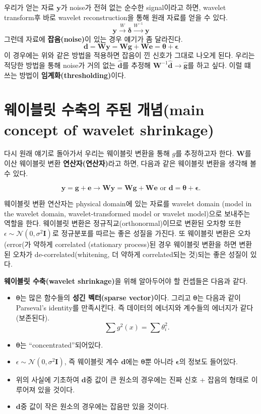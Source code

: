\documentclass[b5paper,]{book}
\theoremstyle{definition}
\theoremstyle{definition}
\theoremstyle{definition}
\theoremstyle{remark}
\begin{document}
우리가 얻는 자료 \(\mathbf{y}\)가 noise가 전혀 없는 순수한 signal이라고
하면, wavelet transform후 바로 wavelet reconstruction을 통해 원래 자료를
얻을 수 있다.
\[\mathbf{y} \xrightarrow{W} \boldsymbol{\delta} \xrightarrow{W^{-1}} \mathbf{y}\]
그런데 자료에 \textbf{잡음(noise)}이 있는 경우 얘기가 좀 달라진다.
\[\mathbf{d}=\mathbf{Wy} =\mathbf{Wg}+\mathbf{We}=\boldsymbol{\theta}+\boldsymbol{\epsilon}\]
이 경우에는 위와 같은 방법을 적용하면 잡음이 낀 신호가 그대로 나오게
된다. 우리는 적당한 방법을 통해 noise가 거의 없는 \(\hat{\mathbf{d}}\)를
추정해
\(\mathbf{W}^{-1}\hat{\mathbf{d}} \rightarrow \hat{\mathbf{g}}\)를 하고
싶다. 이럴 떄 쓰는 방법이 \textbf{임계화(thresholding)}이다.

\section{웨이블릿 수축의 주된 개념(main concept of wavelet
shrinkage)}\label{---main-concept-of-wavelet-shrinkage}

다시 원래 얘기로 돌아가서 우리는 웨이블릿 변환을 통해 \(g\)를 추정하고자
한다. \(\mathbf{W}\)를 이산 웨이블릿 변환 \textbf{연산자(연산자)}라고
하면, 다음과 같은 웨이블릿 변환을 생각해 볼 수 있다.

\[\mathbf{y}=\mathbf{g}+\mathbf{e} \rightarrow \mathbf{Wy} =\mathbf{Wg}+\mathbf{We} \text{ or } \mathbf{d}=\boldsymbol{\theta}+\boldsymbol{\epsilon}.\]

웨이블릿 변환 연산자는 physical domain에 있는 자료를 wavelet domain
(model in the wavelet domain, wavelet-transformed model or wavelet
model)으로 보내주는 역할을 한다. 웨이블릿 변환은
정규직교(orthonormal)이므로 변환된 오차항 또한
\(\epsilon \sim \mathcal{N}(0,\sigma^{2}\mathbf{I})\)로 정규분포를
따르는 좋은 성질을 가진다. 또 웨이블릿 변환은 오차(error(가 약하게
correlated (stationary process)된 경우 웨이블릿 변환을 하면 변환된
오차가 de-correlated(whitening, 더 약하게 correlated되는 것)되는 좋은
성질이 있다.

\textbf{웨이블릿 수축(wavelet shrinkage)}을 위해 알아두어야 할 컨셉들은
다음과 같다.

\begin{itemize}
\item
  \(\boldsymbol{\theta}\)는 많은 함수들의 \textbf{성긴 벡터(sparse
  vector)}이다. 그리고 \(\boldsymbol{\theta}\)는 다음과 같이 Parseval's
  identity를 만족시킨다. 즉 데이터의 에너지와 계수들의 에너지가
  같다(보존된다). \[\sum g^{2}(x)=\sum \theta_{i}^{2}.\]
\item
  \(\boldsymbol{\theta}\)는 ``concentrated''되어있다.
\item
  \(\epsilon \sim \mathcal{N}(0,\sigma^{2}\mathbf{I})\), 즉 웨이블릿
  계수 \(\mathbf{d}\)에는 \(\boldsymbol{\theta}\)뿐 아니라
  \(\mathbf{\epsilon}\)의 정보도 들어있다.
\item
  위의 사실에 기초하여 \(\mathbf{d}\)중 값이 큰 원소의 경우에는 진짜
  신호 + 잡음의 형태로 이루어져 있을 것이다.
\item
  \(\mathbf{d}\)중 값이 작은 원소의 경우에는 잡음만 있을 것이다.
\end{itemize}
\end{document}
